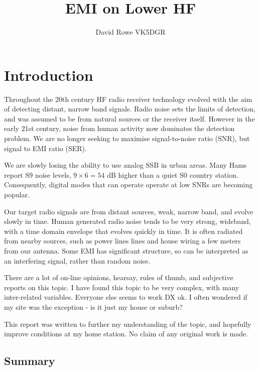 \documentclass{article}
\begin{document}
\title{EMI on Lower HF}
\author{David Rowe VK5DGR}

\maketitle

\section{Introduction}
 
Throughout the 20th century HF radio receiver technology evolved with the aim of detecting distant, narrow band signals.  Radio noise sets the limits of detection, and was assumed to be from natural sources or the receiver itself.  However in the early 21st century, noise from human activity now dominates the detection problem.  We are no longer seeking to maximise signal-to-noise ratio (SNR), but signal to EMI ratio (SER).

We are slowly losing the ability to use analog SSB in urban areas.  Many Hams report S9 noise levels, $9 \times 6 = 54$ dB higher than a quiet S0 country station.  Consequently, digital modes that can operate operate at low SNRs are becoming popular.

Our target radio signals are from distant sources, weak, narrow band, and evolve slowly in time. Human generated radio noise tends to be very strong, wideband, with a time domain envelope that evolves quickly in time.  It is often radiated from nearby sources, such as power lines lines and house wiring a few meters from our antenna.  Some EMI has significant structure, so can be interpreted as an interfering signal, rather than random noise.

There are a lot of on-line opinions, hearsay, rules of thumb, and subjective reports on this topic.  I have found this topic to be very complex, with many inter-related variables. Everyone else seems to work DX ok. I often wondered if my site was the exception - is it just my house or suburb?  

This report was written to further my understanding of the topic, and hopefully improve conditions at my home station. No claim of any original work is made.

\subsection{Summary}
\end{document}
